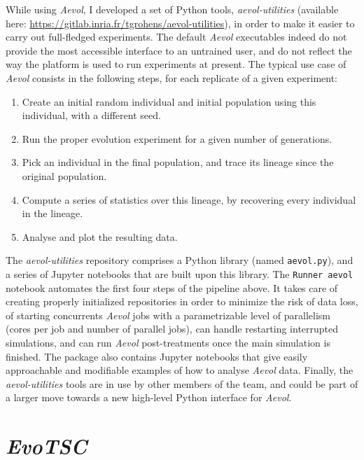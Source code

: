 While using \emph{Aevol}, I developed a set of Python tools, \emph{aevol-utilities} (available here: \url{https://gitlab.inria.fr/tgrohens/aevol-utilities}), in order to make it easier to carry out full-fledged experiments.
The default \emph{Aevol} executables indeed do not provide the most accessible interface to an untrained user, and do not reflect the way the platform is used to run experiments at present.
The typical use case of \emph{Aevol} consists in the following steps, for each replicate of a given experiment:
\begin{enumerate}
\item Create an initial random individual and initial population using this individual, with a different seed.
\item Run the proper evolution experiment for a given number of generations.
\item Pick an individual in the final population, and trace its lineage since the original population.
\item Compute a series of statistics over this lineage, by recovering every individual in the lineage.
\item Analyse and plot the resulting data.
\end{enumerate}

The \emph{aevol-utilities} repository comprises a Python library (named \texttt{aevol.py}), and a series of Jupyter notebooks that are built upon this library.
The \texttt{Runner aevol} notebook automates the first four steps of the pipeline above.
It takes care of creating properly initialized repositories in order to minimize the risk of data loss, of starting concurrents \emph{Aevol} jobs with a parametrizable level of parallelism (cores per job and number of parallel jobs), can handle restarting interrupted simulations, and can run \emph{Aevol} post-treatments once the main simulation is finished.
The package also contains Jupyter notebooks that give easily approachable and modifiable examples of how to analyse \emph{Aevol} data.
Finally, the \emph{aevol-utilities} tools are in use by other members of the team, and could be part of a larger move towards a new high-level Python interface for \emph{Aevol}.



\section{\emph{EvoTSC}}

